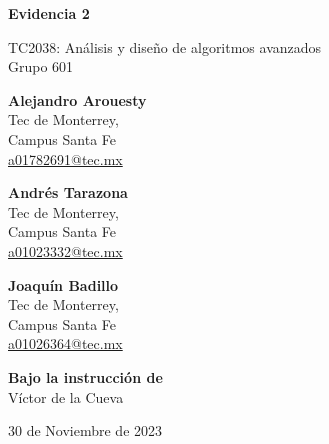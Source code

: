 \documentclass[12pt]{article}
\begin{document}
  \begin{titlepage}
    \begin{center}    
      \vspace{30pt}
      
      \begin{LARGE}\bf{Evidencia 2}\end{LARGE}
      
      \vspace{40pt}

      TC2038: Análisis y diseño de algoritmos avanzados\\
      Grupo 601\\
        
      \vspace{120pt}

      \begin{multicols}{3}
        \textbf{Alejandro Arouesty}\\
        Tec de Monterrey,\\
        Campus Santa Fe\\
        \href{mailto:a01782691@tec.mx}{a01782691@tec.mx}
        
        \columnbreak

        \textbf{Andrés Tarazona}\\
        Tec de Monterrey,\\
        Campus Santa Fe\\
        \href{mailto:a01023332@tec.mx}{a01023332@tec.mx}
        
        \columnbreak

        \textbf{Joaquín Badillo}\\
        Tec de Monterrey,\\
        Campus Santa Fe\\
        \href{mailto:a01026364@tec.mx}{a01026364@tec.mx}
      \end{multicols}
      
      \vspace{100pt}
      
      \textbf{Bajo la instrucción de} \\
      Víctor de la Cueva\\
      
      
      \vspace{120pt}
      
      30 de Noviembre de 2023
    \end{center}
  \end{titlepage}
  \pagebreak
\end{document}
